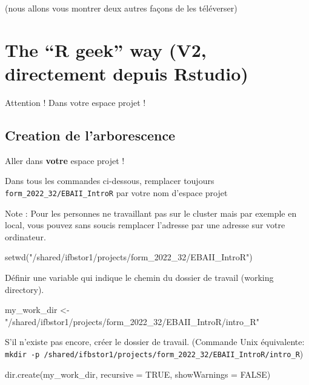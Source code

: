 \documentclass[
]{book}
\newenvironment{Shaded}{\begin{snugshade}}{\end{snugshade}}
\newcommand{\AttributeTok}[1]{\textcolor[rgb]{0.77,0.63,0.00}{#1}}
\newcommand{\ConstantTok}[1]{\textcolor[rgb]{0.00,0.00,0.00}{#1}}
\newcommand{\FunctionTok}[1]{\textcolor[rgb]{0.00,0.00,0.00}{#1}}
\newcommand{\NormalTok}[1]{#1}
\newcommand{\OtherTok}[1]{\textcolor[rgb]{0.56,0.35,0.01}{#1}}
\newcommand{\StringTok}[1]{\textcolor[rgb]{0.31,0.60,0.02}{#1}}
\begin{document}
(nous allons vous montrer deux autres façons de les téléverser)

\hypertarget{the-r-geek-way-v2-directement-depuis-rstudio}{%
\section{The ``R geek'' way (V2, directement depuis Rstudio)}\label{the-r-geek-way-v2-directement-depuis-rstudio}}

Attention ! Dans votre espace projet !

\hypertarget{creation-de-larborescence}{%
\subsection{Creation de l'arborescence}\label{creation-de-larborescence}}

Aller dans \textbf{votre} espace projet !

Dans tous les commandes ci-dessous, remplacer toujours \texttt{form\_2022\_32/EBAII\_IntroR} par votre nom d'espace projet

Note : Pour les personnes ne travaillant pas sur le cluster mais par exemple en local, vous pouvez sans soucis remplacer l'adresse par une adresse sur votre ordinateur.

\begin{Shaded}
\begin{Highlighting}[]
\FunctionTok{setwd}\NormalTok{(}\StringTok{"/shared/ifbstor1/projects/form\_2022\_32/EBAII\_IntroR"}\NormalTok{)}
\end{Highlighting}
\end{Shaded}

Définir une variable qui indique le chemin du dossier de travail (working directory).

\begin{Shaded}
\begin{Highlighting}[]
\NormalTok{my\_work\_dir }\OtherTok{\textless{}{-}} \StringTok{"/shared/ifbstor1/projects/form\_2022\_32/EBAII\_IntroR/intro\_R"} 
\end{Highlighting}
\end{Shaded}

S'il n'existe pas encore, créer le dossier de travail. (Commande Unix équivalente: \texttt{mkdir\ -p\ /shared/ifbstor1/projects/form\_2022\_32/EBAII\_IntroR/intro\_R})

\begin{Shaded}
\begin{Highlighting}[]
\FunctionTok{dir.create}\NormalTok{(my\_work\_dir, }\AttributeTok{recursive =} \ConstantTok{TRUE}\NormalTok{, }\AttributeTok{showWarnings =} \ConstantTok{FALSE}\NormalTok{)}
\end{Highlighting}
\end{Shaded}
\end{document}
